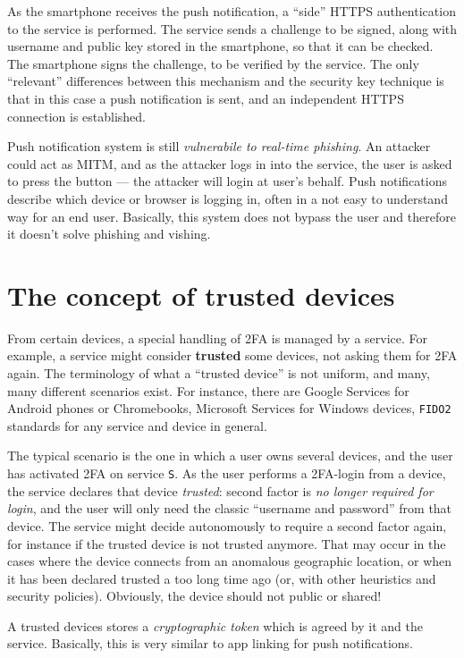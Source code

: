 \documentclass[10pt]{\classname}
\begin{document}
As the smartphone receives the push notification, a ``side'' HTTPS
authentication to the service is performed. The service sends a challenge to be
signed, along with username and public key stored in the smartphone, so that it
can be checked. The smartphone signs the challenge, to be verified by the
service. The only ``relevant'' differences between this mechanism and the
security key technique is that in this case a push notification is sent, and an
independent HTTPS connection is established.

Push notification system is still \emph{vulnerabile to real\--time phishing}.
An attacker could act as MITM, and as the attacker logs in into the service,
the user is asked to press the button --- the attacker will login at user's
behalf. Push notifications describe which device or browser is logging in,
often in a not easy to understand way for an end user. Basically, this system
does not bypass the user and therefore it doesn't solve phishing and vishing.

\section{The concept of trusted devices}

From certain devices, a special handling of 2FA is managed by a service. For
example, a service might consider \textbf{trusted} some devices, not asking
them for 2FA again. The terminology of what a ``trusted device'' is not
uniform, and many, many different scenarios exist. For instance, there are
Google Services for Android phones or Chromebooks, Microsoft Services for
Windows devices, \texttt{FIDO2} standards for any service and device in
general.

The typical scenario is the one in which a user owns several devices, and the
user has activated 2FA on service \texttt{S}. As the user performs a
2FA\--login from a device, the service declares that device \emph{trusted}:
second factor is \emph{no longer required for login}, and the user will only
need the classic ``username and password'' from that device. The service might
decide autonomously to require a second factor again, for instance if the
trusted device is not trusted anymore. That may occur in the cases where the
device connects from an anomalous geographic location, or when it has been
declared trusted a too long time ago (or, with other heuristics and security
policies). Obviously, the device should not public or shared!

A trusted devices stores a \emph{cryptographic token} which is agreed by it and
the service. Basically, this is very similar to app linking for push
notifications.
\end{document}

